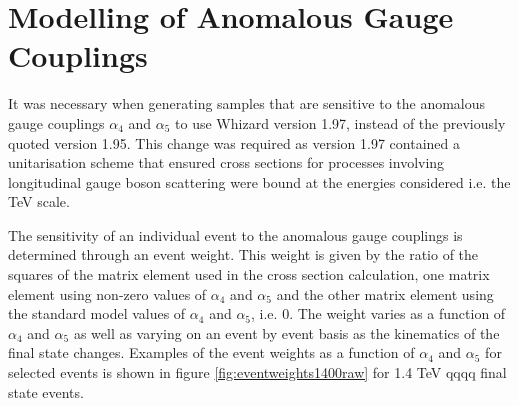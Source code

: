
\section{Modelling of Anomalous Gauge Couplings}
\label{sec:modellingofanomalouscouplings}
It was necessary when generating samples that are sensitive to the anomalous gauge couplings $\alpha_{4}$ and $\alpha_{5}$ to use Whizard version 1.97, instead of the previously quoted version 1.95.  This change was required as version 1.97 contained a unitarisation scheme that ensured cross sections for processes involving longitudinal gauge boson scattering were bound at the energies considered i.e. the TeV scale.  

The sensitivity of an individual event to the anomalous gauge couplings is determined through an event weight. This weight is given by the ratio of the squares of the matrix element used in the cross section calculation, one matrix element using non-zero values of $\alpha_{4}$ and $\alpha_{5}$ and the other matrix element using the standard model values of $\alpha_{4}$ and $\alpha_{5}$, i.e. 0.  The weight varies as a function of $\alpha_{4}$ and $\alpha_{5}$ as well as varying on an event by event basis as the kinematics of the final state changes.  Examples of the event weights as a function of $\alpha_{4}$ and $\alpha_{5}$ for selected events is shown in figure \ref{fig:eventweights1400raw} for 1.4 TeV \nu{\nu}qqqq final state events.

